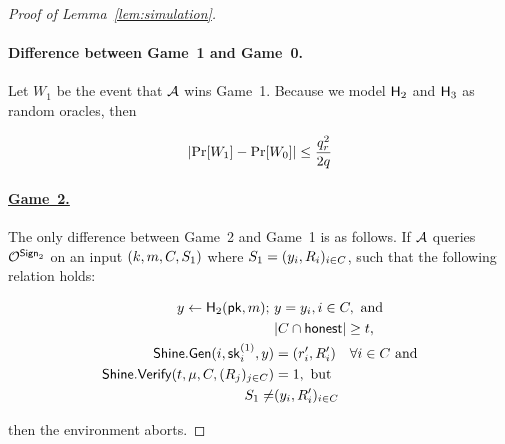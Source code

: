 \begin{proof}[Proof of Lemma~\ref{lem:simulation}]
  \paragraph{Difference between Game~1 and Game~0.}
  Let $W_1$ be the event that $\mathcal{A}$ wins Game~1.
  Because we model $\mathsf{H}_2$ and $\mathsf{H}_3$ as random oracles,
  then

  \begin{equation} \label{eq:game1}
    \lvert \Pr[W_1] - \Pr[W_0] \rvert \leq \frac{q_r^2}{2q}
  \end{equation}



  \paragraph{\underline{Game~2.}}
  The only difference between Game~2 and Game~1 is as follows.
  If $\mathcal{A}$  queries $\mathcal{O}^{\mathsf{Sign}_2}$ on
  an input $(k, m, C, S_1)$
  where $S_1 = (y_i, R_{i} )_{i \in C}$,
  such that the following relation holds:

  \begin{align} \label{eq:game-coll-ver-arctic}
    \begin{split}
      y \gets \mathsf{H}_2(\mathsf{pk}, m);\ & y=y_i, i \in C, \text{ and } \\
      & \lvert C \cap \mathsf{honest} \rvert \geq t, \\
      \mathsf{Shine}.\mathsf{Gen}(i, \mathsf{sk}^{(1)}_i, y) & = (r_i', R_i') \quad \forall i \in C  \text{ and} \\
      \mathsf{Shine}.\mathsf{Verify}(t, \mu, C, (R_{j} )_{j \in C}) &= 1, \text{ but} \\
      S_1 \neq & (y_i, R_i')_{i \in C} \\
    \end{split}
  \end{align}

  then the environment aborts.



\end{proof}
